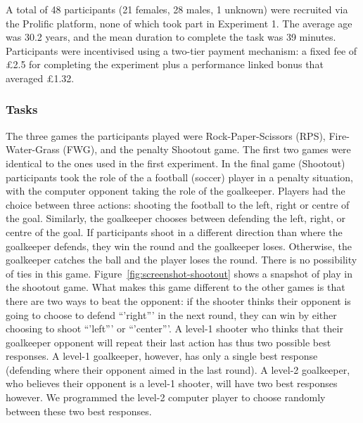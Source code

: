 \documentclass[man,floatsintext]{apa6}
\begin{document}
A total of 48 participants (21 females, 28 males, 1 unknown) were recruited via the Prolific platform, none of which took part in Experiment 1. The average age was 30.2 years, and the mean duration to complete the task was 39 minutes. Participants were incentivised using a two-tier payment mechanism: a fixed fee of £2.5 for completing the experiment plus a performance linked bonus that averaged £1.32.

\hypertarget{tasks-1}{%
\subsubsection{Tasks}\label{tasks-1}}

The three games the participants played were Rock-Paper-Scissors (RPS), Fire-Water-Grass (FWG), and the penalty Shootout game. The first two games were identical to the ones used in the first experiment. In the final game (Shootout) participants took the role of the a football (soccer) player in a penalty situation, with the computer opponent taking the role of the goalkeeper. Players had the choice between three actions: shooting the football to the left, right or centre of the goal. Similarly, the goalkeeper chooses between defending the left, right, or centre of the goal. If participants shoot in a different direction than where the goalkeeper defends, they win the round and the goalkeeper loses. Otherwise, the goalkeeper catches the ball and the player loses the round. There is no possibility of ties in this game. Figure~\ref{fig:screenshot-shootout} shows a snapshot of play in the shootout game. What makes this game different to the other games is that there are two ways to beat the opponent: if the shooter thinks their opponent is going to choose to defend \enquote{'right}' in the next round, they can win by either choosing to shoot \enquote{'left}' or \enquote{'center}'. A level-1 shooter who thinks that their goalkeeper opponent will repeat their last action has thus two possible best responses. A level-1 goalkeeper, however, has only a single best response (defending where their opponent aimed in the last round). A level-2 goalkeeper, who believes their opponent is a level-1 shooter, will have two best responses however. We programmed the level-2 computer player to choose randomly between these two best responses.
\end{document}
